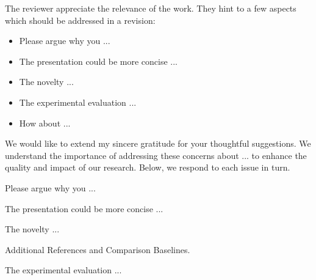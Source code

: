 \AssociateEditor
\begin{generalcomment}
The reviewer appreciate the relevance of the work. They hint to a few aspects which should be addressed in a revision:
\begin{itemize}
    \item Please argue why you ... 
    \item The presentation could be more concise ... 
    \item The novelty ...   
    \item The experimental evaluation ...
    \item How about ...
\end{itemize}
\end{generalcomment}
\begin{revmeta}[]
We would like to extend my sincere gratitude for your thoughtful suggestions. We understand the importance of addressing these concerns about ... to enhance the quality and impact of our research. Below, we respond to each issue in turn.  
\end{revmeta}

\begin{revcommentToAssociateEditor}
Please argue why you ... 
\label{sec:why-use-bert}
\end{revcommentToAssociateEditor}
\begin{revmeta}[]
    \lipsum[1] \cite{gawlikowski2023survey,bi2018empirical,johnson2019survey}
\end{revmeta}



\begin{revcommentToAssociateEditor}
The presentation could be more concise ...
\end{revcommentToAssociateEditor}
\begin{revmeta}[]
    \lipsum[2] \cite{zhang2021videolt,ganganwar2012overview,cao2019learning}
\end{revmeta}


\begin{revcommentToAssociateEditor}
The novelty ...
\end{revcommentToAssociateEditor}
\begin{revmeta}[]
    \lipsum[3]
\end{revmeta}

\begin{revcommentToAssociateEditor}
Additional References and Comparison Baselines. 
\end{revcommentToAssociateEditor}
\begin{revmeta}[]
    \lipsum[4]
\end{revmeta}


\begin{revcommentToAssociateEditor}
The experimental evaluation ...
\end{revcommentToAssociateEditor}
\begin{revmeta}[]
    \lipsum[5]
\end{revmeta}

\clearpage
\printbibliography[heading=bibliography, title={References}, section=\therefsection]
\markboth{}{}
